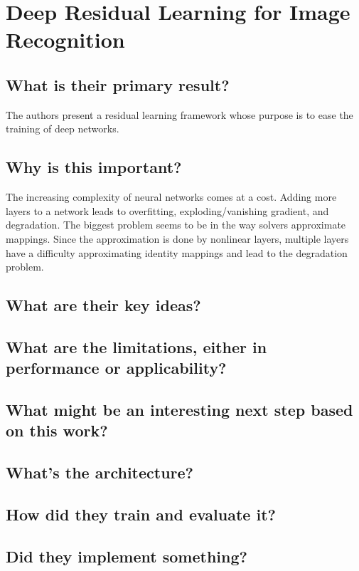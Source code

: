 \section{Deep Residual Learning for Image Recognition}
\subsection*{What is their primary result?}
The authors present a residual learning framework whose purpose is to ease the
training of deep networks. 

\subsection*{Why is this important?}
The increasing complexity of neural networks comes at a cost. Adding more layers
to a network leads to overfitting, exploding/vanishing gradient, and
degradation. The biggest problem seems to be in the way solvers approximate
mappings. Since the approximation is done by nonlinear layers, multiple layers
have a difficulty approximating identity mappings and lead to the degradation
problem.  

\subsection*{What are their key ideas?}

\subsection*{What are the limitations, either in performance or applicability?}

\subsection*{What might be an interesting next step based on this work?}

\subsection*{What's the architecture?}

\subsection*{How did they train and evaluate it?}

\subsection*{Did they implement something?}


